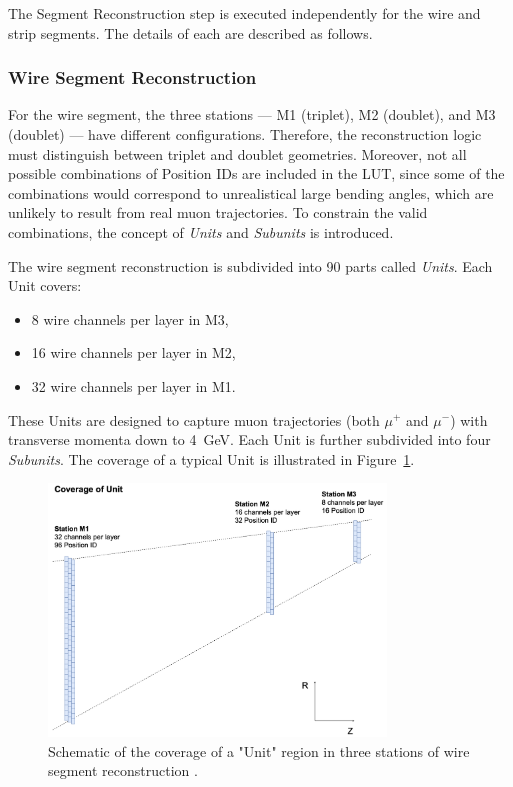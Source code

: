 The Segment Reconstruction step is executed independently for the wire and strip segments. The details of each are described as follows.

\subsubsection{Wire Segment Reconstruction}

For the wire segment, the three stations --- M1 (triplet), M2 (doublet), and M3 (doublet) --- have different configurations. Therefore, the reconstruction logic must distinguish between triplet and doublet geometries. Moreover, not all possible combinations of Position IDs are included in the LUT, since some of the combinations would correspond to unrealistical large bending angles, which are unlikely to result from real muon trajectories. To constrain the valid combinations, the concept of \textit{Units} and \textit{Subunits} is introduced.

The wire segment reconstruction is subdivided into 90 parts called \textit{Units}. Each Unit covers:
\begin{itemize}
  \item 8 wire channels per layer in M3,
  \item 16 wire channels per layer in M2,
  \item 32 wire channels per layer in M1.
\end{itemize}
These Units are designed to capture muon trajectories (both $\mu^+$ and $\mu^-$) with transverse momenta down to 4~GeV. Each Unit is further subdivided into four \textit{Subunits}. The coverage of a typical Unit is illustrated in Figure~\ref{fig:wire_unit}.

\begin{figure}[htbp]
  \centering
  \includegraphics[width=0.8\textwidth]{figs/chapter5/wire_unit.png}
  \caption{Schematic of the coverage of a "Unit" region in three stations of wire segment reconstruction \cite{EndcapSLPDR}.}
  \label{fig:wire_unit}
\end{figure}

